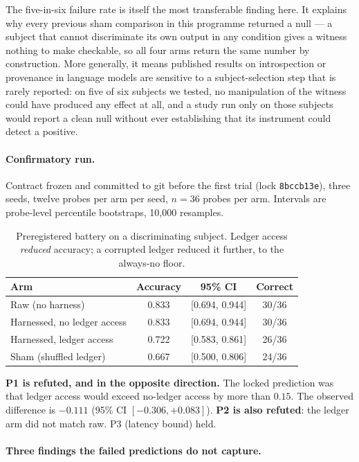 \documentclass[11pt]{article}
\begin{document}
The five-in-six failure rate is itself the most transferable finding here.
It explains why every previous sham comparison in this programme returned a
null --- a subject that cannot discriminate its own output in any condition
gives a witness nothing to make checkable, so all four arms return the same
number by construction. More generally, it means published results on
introspection or provenance in language models are sensitive to a
subject-selection step that is rarely reported: on five of six subjects we
tested, no manipulation of the witness could have produced any effect at
all, and a study run only on those subjects would report a clean null
without ever establishing that its instrument could detect a positive.

\paragraph{Confirmatory run.} Contract frozen and committed to git before
the first trial (lock \texttt{8bccb13e}), three seeds, twelve probes per
arm per seed, $n=36$ probes per arm. Intervals are probe-level percentile
bootstraps, 10{,}000 resamples.

\begin{table}[h]
\centering
\begin{tabular}{lccc}
\toprule
Arm & Accuracy & 95\% CI & Correct \\
\midrule
Raw (no harness) & 0.833 & [0.694, 0.944] & 30/36 \\
Harnessed, no ledger access & 0.833 & [0.694, 0.944] & 30/36 \\
Harnessed, ledger access & 0.722 & [0.583, 0.861] & 26/36 \\
Sham (shuffled ledger) & 0.667 & [0.500, 0.806] & 24/36 \\
\bottomrule
\end{tabular}
\caption{Preregistered battery on a discriminating subject. Ledger access
\emph{reduced} accuracy; a corrupted ledger reduced it further, to the
always-no floor.}
\label{tab:laguna}
\end{table}

\noindent\textbf{P1 is refuted, and in the opposite direction.} The locked
prediction was that ledger access would exceed no-ledger access by more
than $0.15$. The observed difference is $-0.111$ (95\% CI
$[-0.306, +0.083]$). \textbf{P2 is also refuted}: the ledger arm did not
match raw. P3 (latency bound) held.

\paragraph{Three findings the failed predictions do not capture.}
\end{document}
